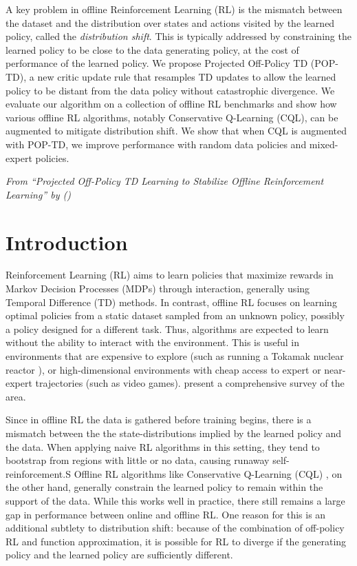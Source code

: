 

A key problem in offline Reinforcement Learning (RL) is the mismatch between the dataset and the distribution over states and actions visited by the learned policy, called the \emph{distribution shift}. This is typically addressed by constraining the learned policy to be close to the data generating policy, at the cost of performance of the learned policy. We propose Projected Off-Policy TD (POP-TD), a new critic update rule that resamples TD updates to allow the learned policy to be distant from the data policy without catastrophic divergence. We evaluate our algorithm on a collection of offline RL benchmarks and show how various offline RL algorithms, notably Conservative Q-Learning (CQL), can be augmented to mitigate distribution shift. We show that when CQL is augmented with POP-TD, we improve performance with random data policies and mixed-expert policies.

\emph{From ``Projected Off-Policy TD Learning to Stabilize Offline Reinforcement Learning'' by \citeauthor{manek2023poptd} (\citeyear{manek2023poptd})}

\clearpage


\section{Introduction}

Reinforcement Learning (RL) aims to learn policies that maximize rewards in Markov Decision Processes (MDPs) through interaction, generally using Temporal Difference (TD) methods. In contrast, offline RL focuses on learning optimal policies from a static dataset sampled from an unknown policy, possibly a policy designed for a different task. Thus, algorithms are expected to learn without the ability to interact with the environment.
This is useful in environments that are expensive to explore (such as running a Tokamak nuclear reactor \cite{degrave2022magnetic}), or high-dimensional environments with cheap access to expert or near-expert trajectories (such as video games). \citet{levine2020survey} present a comprehensive survey of the area.

Since in offline RL the data is gathered before training begins, there is a mismatch between the the state-distributions implied by the learned policy and the data.
When applying naive RL algorithms in this setting, they tend to bootstrap from regions with little or no data, causing runaway self-reinforcement.S
Offline RL algorithms like Conservative Q-Learning (CQL) \cite{kumar2020cql}, on the other hand, generally constrain the learned policy to remain within the support of the data. While this works well in practice, there still remains a large gap in performance between online and offline RL. One reason for this is an additional subtlety to distribution shift: because of the combination of off-policy RL and function approximation, it is possible for RL to diverge if the generating policy and the learned policy are sufficiently different.

